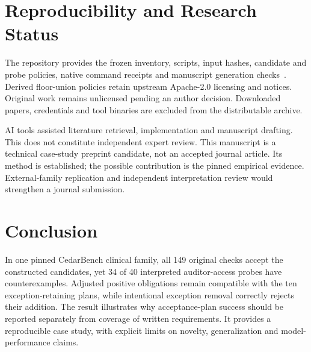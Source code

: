 \documentclass[sigconf,nonacm]{acmart}
\begin{document}
\balance
\section{Reproducibility and Research Status}
The repository provides the frozen inventory, scripts, input hashes, candidate and probe policies, native command receipts and manuscript generation checks~\cite{ours}. Derived floor-union policies retain upstream Apache-2.0 licensing and notices. Original work remains unlicensed pending an author decision. Downloaded papers, credentials and tool binaries are excluded from the distributable archive.

AI tools assisted literature retrieval, implementation and manuscript drafting. This does not constitute independent expert review. This manuscript is a technical case-study preprint candidate, not an accepted journal article. Its method is established; the possible contribution is the pinned empirical evidence. External-family replication and independent interpretation review would strengthen a journal submission.

\section{Conclusion}
In one pinned CedarBench clinical family, all 149 original checks accept the constructed candidates, yet 34 of 40 interpreted auditor-access probes have counterexamples. Adjusted positive obligations remain compatible with the ten exception-retaining plans, while intentional exception removal correctly rejects their addition. The result illustrates why acceptance-plan success should be reported separately from coverage of written requirements. It provides a reproducible case study, with explicit limits on novelty, generalization and model-performance claims.
\end{document}
